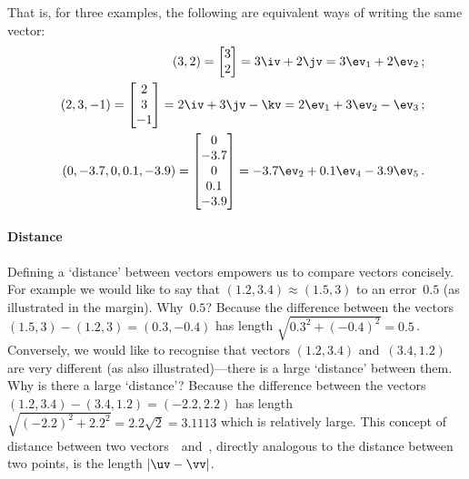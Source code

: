That is, for three examples, the following are equivalent ways of writing the same vector:
\begin{eqnarray*}&&
(3,2)=\begin{bmatrix} 3\\2 \end{bmatrix}=3\iv+2\jv=3\ev_1+2\ev_2\,;
\\&&
(2,3,-1)=\begin{bmatrix} 2\\3\\-1 \end{bmatrix}
=2\iv+3\jv-\kv=2\ev_1+3\ev_2-\ev_3\,;
\\&&
(0,-3.7,0,0.1,-3.9)
=\begin{bmatrix} 0\\-3.7\\0\\0.1\\-3.9 \end{bmatrix}
=-3.7\ev_2+0.1\ev_4-3.9\ev_5\,.
\end{eqnarray*}




\paragraph{Distance}
Defining a `distance' between vectors empowers us to compare vectors concisely.
For example we would like to say that \((1.2,3.4)\approx(1.5,3)\) to an error~\(0.5\) (as illustrated in the margin).
Why~\(0.5\)?  Because the difference between the vectors \((1.5,3)-(1.2,3)=(0.3,-0.4)\) has length \(\sqrt{0.3^2+(-0.4)^2}=0.5\)\,.
%
Conversely, we would like to recognise that vectors \((1.2,3.4)\) and~\((3.4,1.2)\) are very different (as also illustrated)---there is a large `distance' between them.
Why is there a large `distance'?  Because the difference between the vectors \((1.2,3.4)-(3.4,1.2)=(-2.2,2.2)\) has length \(\sqrt{(-2.2)^2+2.2^2}=2.2\sqrt2=3.1113\) which is relatively large.
This concept of distance between two vectors~\uv\ and~\vv, directly analogous to the distance between two points, is the length \(|\uv-\vv|\).

